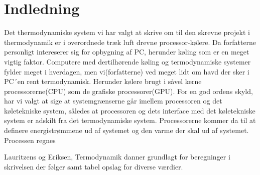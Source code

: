 \section{Indledning}

Det thermodynamiske system vi har valgt at skrive om til den skrevne projekt i thermodynamik er i overordnede træk luft drevne processor-kølere. 
Da forfatterne personligt intereserer sig for opbygning af PC, herunder køling som er en meget vigtig faktor.
Computere med dertilhørende køling og termodynamiske systemer fylder meget i hverdagen, men vi(forfatterne) ved meget lidt om havd der sker i PC´en rent termodynamisk.
Herunder kølere brugt i såvel kerne processorerne(CPU) som de grafiske processorer(GPU). For en god ordens skyld, har vi valgt at sige at systemgrænserne går imellem processoren og det køletekniske system, således at processoren og dets interface med det køletekniske system er adskilt fra det termodynamiske system.
Processorerne kommer da til at definere energistrømmene ud af systemet og den varme der skal ud af systemet.
Processen regnes 



Lauritzens og Eriksen, Termodynamik danner grundlagt for beregninger i skrivelsen der følger samt tabel opslag for diverse værdier. 